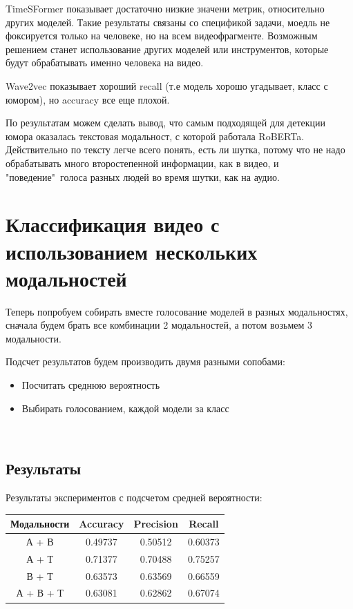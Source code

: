 \documentclass[PMI,VKR]{HSEUniversity}
\begin{document}
TimeSFormer показывает достаточно низкие значени метрик, относительно других моделей. Такие результаты связаны со спецификой задачи, моедль не фоксируется только на человеке, но на всем видеофрагменте. Возможным решением станет использование других моделей или инструментов, которые будут обрабатывать именно человека на видео.

Wave2vec показывает хороший recall (т.е модель хорошо угадывает, класс с юмором), но accuracy все еще плохой.

По результатам можем сделать вывод, что самым подходящей для детекции юмора оказалась текстовая модальност, с которой работала RoBERTa. Действительно по тексту легче всего понять, есть ли шутка, потому что не надо обрабатывать много второстепенной информации, как в видео, и "поведение"\ голоса разных людей во время шутки, как на аудио.

\section{Классификация видео с использованием нескольких модальностей}

Теперь попробуем собирать вместе голосование моделей в разных модальностях, сначала будем брать все комбинации 2 модальностей, а потом возьмем 3 модальности.

Подсчет результатов будем производить двумя разными сопобами:
\begin{itemize}
    \item Посчитать среднюю вероятность
    \item Выбирать голосованием, каждой модели за класс
\end{itemize} \\

\subsection{Результаты}

Результаты экспериментов с подсчетом средней вероятности: \\

\begin{center}
    \begin{tabular}{ |c||c|c|c| }
        \hline
        Модальности & Accuracy & Precision & Recall  \\
        \hline
        А + В       & 0.49737  & 0.50512   & 0.60373 \\
        А + Т       & 0.71377  & 0.70488   & 0.75257 \\
        В + Т       & 0.63573  & 0.63569   & 0.66559 \\
        А + В + Т   & 0.63081  & 0.62862   & 0.67074 \\
        \hline
    \end{tabular}
\end{center} \\
\end{document}
